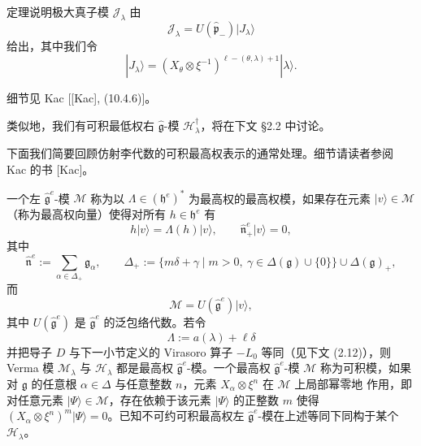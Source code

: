 定理说明极大真子模 $\mathcal{J}_{\lambda}$ 由
\begin{equation}
\mathcal{J}_{\lambda}=U(\hat{\mathfrak{p}}_-)|J_{\lambda}\rangle \tag{2.9}
\end{equation}
给出，其中我们令
\begin{equation}
|J_{\lambda}\rangle=(X_{\theta}\otimes\xi^{-1})^{\ell-(\theta,\lambda)+1}|\lambda\rangle. \tag{2.10}
\end{equation}


细节见 Kac [[Kac], (10.4.6)]。

类似地，我们有可积最低权右 $\hat{\mathfrak{g}}$-模 $\mathcal{H}^{\dagger}_{\lambda}$，将在下文
\S 2.2 中讨论。

下面我们简要回顾仿射李代数的可积最高权表示的通常处理。细节请读者参阅 Kac 的书 [Kac]。

一个左 $\hat{\mathfrak{g}}^{e}$-模 $\mathcal{M}$ 称为以
$\Lambda\in(\mathfrak{h}^{e})^*$ 为最高权的最高权模，如果存在元素
$|v\rangle\in\mathcal{M}$（称为最高权向量）使得对所有 $h\in\mathfrak{h}^{e}$ 有
\[
h|v\rangle=\Lambda(h)|v\rangle,\qquad \hat{\mathfrak{n}}^{e}_+|v\rangle=0,
\]
其中
\[
\hat{\mathfrak{n}}^{e}:=\sum_{\alpha\in\Delta_+}\mathfrak{g}_{\alpha},\qquad
\Delta_+:=\{m\delta+\gamma\mid m>0,\ \gamma\in\Delta(\mathfrak{g})\cup\{0\}\}\cup
\Delta(\mathfrak{g})_+,
\]
而
\[
\mathcal{M}=U(\hat{\mathfrak{g}}^{e})|v\rangle,
\]
其中 $U(\hat{\mathfrak{g}}^{e})$ 是 $\hat{\mathfrak{g}}^{e}$ 的泛包络代数。若令
\[
\Lambda:=a(\lambda)+\ell\delta
\]
并把导子 $D$ 与下一小节定义的 Virasoro 算子 $-L_0$ 等同（见下文 (2.12)），则 Verma 模
$\mathcal{M}_{\lambda}$ 与 $\mathcal{H}_{\lambda}$ 都是最高权 $\hat{\mathfrak{g}}^{e}$-模。一个最高权
$\hat{\mathfrak{g}}^{e}$-模 $\mathcal{M}$ 称为可积模，如果对 $\mathfrak{g}$ 的任意根
$\alpha\in\Delta$ 与任意整数 $n$，元素 $X_{\alpha}\otimes\xi^{n}$ 在 $\mathcal{M}$ 上局部幂零地
作用，即对任意元素 $|\Psi\rangle\in\mathcal{M}$，存在依赖于该元素 $|\Psi\rangle$ 的正整数 $m$
使得 $(X_{\alpha}\otimes\xi^{n})^{m}|\Psi\rangle=0$。已知不可约可积最高权左
$\hat{\mathfrak{g}}^{e}$-模在上述等同下同构于某个 $\mathcal{H}_{\lambda}$。

